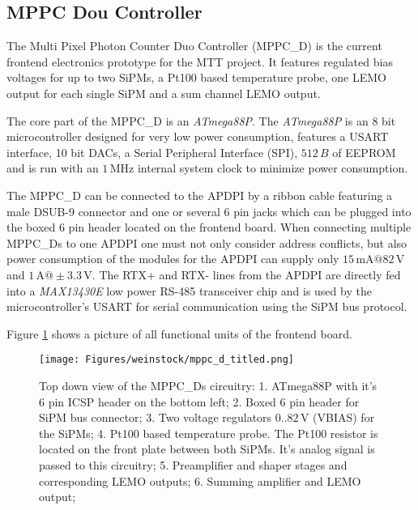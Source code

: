 \documentclass[]{article}
\begin{document}
\subsection{MPPC Dou Controller}

The Multi Pixel Photon Counter Duo Controller (MPPC\_D) is the current frontend electronics prototype for the MTT project. It features regulated bias voltages for up to two SiPMs, 
a Pt100 based temperature probe, one LEMO output for each single SiPM and a sum channel LEMO output.

The core part of the MPPC\_D is an \emph{ATmega88P}. The \emph{ATmega88P} is an 8 bit microcontroller designed for very low power consumption, features a 
USART interface, 10 bit DACs, a Serial Peripheral Interface (SPI), $512\,B$ of EEPROM and is run with an $1\,\text{MHz}$ internal system clock to minimize 
power consumption. 

The MPPC\_D can be connected to the APDPI by a ribbon cable featuring a male DSUB-9 connector and one or several 6 pin jacks which can be plugged into the boxed 6 pin header
located on the frontend board. When connecting multiple MPPC\_Ds to one APDPI one must not only consider address conflicts, but also power consumption of the modules for the APDPI
can supply only $15\,\text{mA}@82\,\text{V}$ and $1\,\text{A}@\pm3.3\,\text{V}$. The RTX+ and RTX- lines from the APDPI are directly fed into a \emph{MAX13430E} low power RS-485 
transceiver chip and is used by the microcontroller's USART for serial communication using the SiPM bus protocol.  

Figure \ref{mppc_top} shows a picture of all functional units of the frontend board.
	
	\begin{figure}[t]
		\centering
			\texttt{[image: Figures/weinstock/mppc\_d\_titled.png]}
		\caption{Top down view of the MPPC\_Ds circuitry: 1. ATmega88P with it's 6 pin ICSP header on the bottom left; 
								  2. Boxed 6 pin header for SiPM bus connector;
								  3. Two voltage regulators $0..82\,\text{V}$ (VBIAS) for the SiPMs;
								  4. Pt100 based temperature probe. The Pt100 resistor is located on the front plate between both SiPMs. 
								       It's analog signal is passed to this circuitry;
								  5. Preamplifier and shaper stages and corresponding LEMO outputs; 
								  6. Summing amplifier and LEMO output;
			}
		\label{mppc_top}
	\end{figure}	

\newpage
\end{document}
